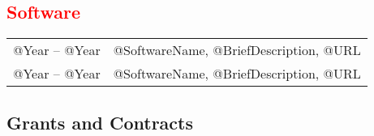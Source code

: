 \documentclass[10pt]{article}
\renewcommand{\new}[1]{\textcolor{red}{#1}}
\renewcommand{\iowa}[1]{#1}
\renewcommand{\iowa}[1]{}
\begin{document}
\subsection*{\new{Software}}
\smallskip

\begin{tabular}{l@{\quad\ }l} 
 @Year -- @Year
 & @SoftwareName, @BriefDescription, @URL
\\[0.5ex]
 @Year -- @Year
 & @SoftwareName, @BriefDescription, @URL
\end{tabular}

\iowa{
\subsection*{Areas of Research Interest}
\smallskip

\begin{itemize} \setlength{\itemsep}{0ex}
 \item [] @Area
 \item [] @Area
 \item [] @Area
\end{itemize}
}

\subsection*{Grants and Contracts}
\smallskip
\end{document}
